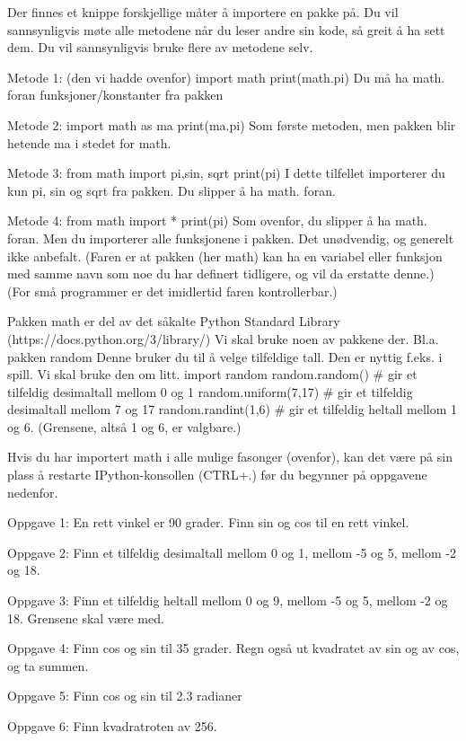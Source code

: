Der finnes et knippe forskjellige måter å importere en pakke på.
Du vil sannsynligvis møte alle metodene når du leser andre sin kode,
så greit å ha sett dem. 
Du vil sannsynligvis bruke flere av metodene selv.

Metode 1: (den vi hadde ovenfor)
import math
print(math.pi)
Du må ha math. foran funksjoner/konstanter fra pakken

Metode 2:
import math as ma
print(ma.pi)
Som første metoden, men pakken blir hetende ma i stedet for math.

Metode 3:
from math import pi,sin, sqrt
print(pi)
I dette tilfellet importerer du kun pi, sin og sqrt fra pakken.
Du slipper å ha math. foran. 

Metode 4:
from math import *
print(pi)
Som ovenfor, du slipper å ha math. foran.
Men du importerer alle funksjonene i pakken. 
Det unødvendig, og generelt ikke anbefalt.
(Faren er at pakken (her math) kan ha en variabel eller funksjon med samme navn
som noe du har definert tidligere, og vil da erstatte denne.) 
(For små programmer er det imidlertid faren kontrollerbar.) 


Pakken math er del av det såkalte Python Standard Library
(https://docs.python.org/3/library/)
Vi skal bruke noen av pakkene der.
Bl.a. pakken random
Denne bruker du til å velge tilfeldige tall.
Den er nyttig f.eks. i spill. Vi skal bruke den om litt. 
import random
random.random()          # gir et tilfeldig desimaltall mellom 0 og 1
random.uniform(7,17)     # gir et tilfeldig desimaltall mellom 7 og 17
random.randint(1,6)      # gir et tilfeldig heltall mellom 1 og 6. (Grensene, altså 1 og 6, er valgbare.) 


Hvis du har importert math i alle mulige fasonger (ovenfor),
kan det være på sin plass å restarte IPython-konsollen (CTRL+.)
før du begynner på oppgavene nedenfor. 


Oppgave 1: En rett vinkel er 90 grader. Finn sin og cos til en rett vinkel.

Oppgave 2: Finn et tilfeldig desimaltall mellom 0 og 1, mellom -5 og 5, mellom -2 og 18.

Oppgave 3: Finn et tilfeldig heltall mellom 0 og 9, mellom -5 og 5, mellom -2 og 18.
Grensene skal være med. 

Oppgave 4: Finn cos og sin til 35 grader.
Regn også ut kvadratet av sin og av cos, og ta summen.

Oppgave 5: Finn cos og sin til 2.3 radianer 

Oppgave 6: Finn kvadratroten av 256. 

